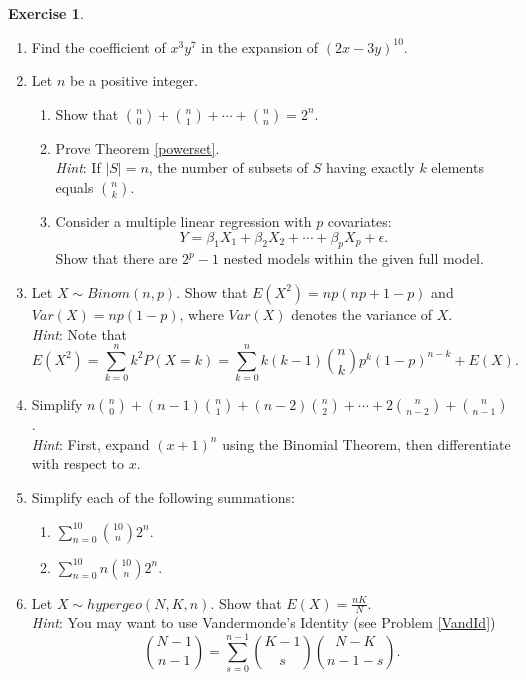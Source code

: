 \documentclass[12pt,letterpaper]{book}
\numberwithin{equation}{section}
\theoremstyle{definition}
\newtheorem{exercise}{\textbf{Exercise}}[chapter]
\begin{document}
\begin{exercise}\quad\label{counting exercises}
\begin{enumerate}[\bfseries 1.]
\item Find the coefficient of $x^{3}y^{7}$ in the expansion of $(2x-3y)^{10}$.
\item\label{counting set} Let $n$ be a positive integer.
\begin{enumerate}
\item \label{application of binomial theorem}Show that ${n \choose 0} + {n\choose 1} + \cdots + {n\choose n} = 2^n$.
\item Prove Theorem \ref{powerset}.\\
\textit{Hint}: If $|S|=n$, the number of subsets of $S$ having exactly $k$ elements equals ${n \choose k}$.
\item Consider a multiple linear regression with $p$ covariates:
$$Y=\beta_1X_1+\beta_2X_2+\cdots+\beta_pX_p+\epsilon.$$
Show that there are $2^p-1$ nested models within the given full model. 
\end{enumerate}

\item Let $X\sim Binom(n,p)$. Show that $E(X^2)=np(np+1-p)$ and $Var(X)=np(1-p)$, where $Var(X)$ denotes the variance of $X$. \\
\textit{Hint}: Note that $$E(X^2)=\sum_{k=0}^n k^2P(X=k)=\sum_{k=0}^n k(k-1){n\choose k}p^k(1-p)^{n-k}+E(X).$$
\item Simplify $\displaystyle{n{n \choose 0}+(n-1){n \choose 1}+(n-2){n \choose 2}+\cdots+2{n\choose n-2}+{n \choose n-1}}$.\\
\textit{Hint}: First, expand $(x+1)^n$ using the Binomial Theorem, then differentiate with respect to $x$.
\item Simplify each of the following summations:
\begin{enumerate}
\item $\displaystyle{\sum_{n=0}^{10} {10 \choose n} 2^n}$.
\item $\displaystyle{\sum_{n=0}^{10} n{10 \choose n} 2^n}$.
\end{enumerate}
\item Let $X\sim hypergeo(N,K,n)$. Show that $E(X)=\frac{nK}{N}$.\\\textit{Hint}: You may want to use Vandermonde's Identity (see Problem \ref{VandId})
$${N-1 \choose n-1}=\sum_{s=0}^{n-1} {K-1 \choose s}{N-K \choose n-1-s}.$$
\end{enumerate}
\end{exercise}
\end{document}
